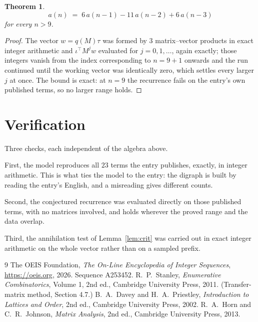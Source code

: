 \documentclass[11pt,a4paper]{article}
\theoremstyle{plain}
\newtheorem{theorem}{Theorem}
\theoremstyle{definition}
\begin{document}
\begin{theorem}
\[
a(n)\;=\;6\,a(n-1) - 11\,a(n-2) + 6\,a(n-3)
\]
for every $n>9$.
\end{theorem}

\begin{proof}
The vector $w=q(M)\tau$ was formed by $3$ matrix--vector products in exact integer
arithmetic and $\iota^{\!\top}M^{j}w$ evaluated for $j=0,1,\dots$, again exactly; those
integers vanish from the index corresponding to $n=9+1$ onwards and the run continued
until the working vector was identically zero, which settles every larger $j$ at once. The bound is exact: at $n=9$ the recurrence fails on the entry's own published terms, so no larger range holds.
\end{proof}

\section{Verification}

Three checks, each independent of the algebra above.

First, the model reproduces all $23$ terms the entry publishes, exactly, in integer
arithmetic. This is what ties the model to the entry: the digraph is built by reading the
entry's English, and a misreading gives different counts.

Second, the conjectured recurrence was evaluated directly on those published terms, with no
matrices involved, and holds wherever the proved range and the data overlap.

Third, the annihilation test of Lemma~\ref{lem:crit} was carried out in exact integer
arithmetic on the whole vector rather than on a sampled prefix.

\begin{thebibliography}{9}
 The OEIS Foundation, \emph{The On-Line Encyclopedia of Integer
Sequences}, \url{https://oeis.org}, 2026. Sequence A253452.
 R.~P.~Stanley, \emph{Enumerative Combinatorics}, Volume 1, 2nd ed.,
Cambridge University Press, 2011. (Transfer-matrix method, Section 4.7.)
 B.~A.~Davey and H.~A.~Priestley, \emph{Introduction to Lattices and
Order}, 2nd ed., Cambridge University Press, 2002.
 R.~A.~Horn and C.~R.~Johnson, \emph{Matrix Analysis}, 2nd ed., Cambridge
University Press, 2013.
\end{thebibliography}
\end{document}
